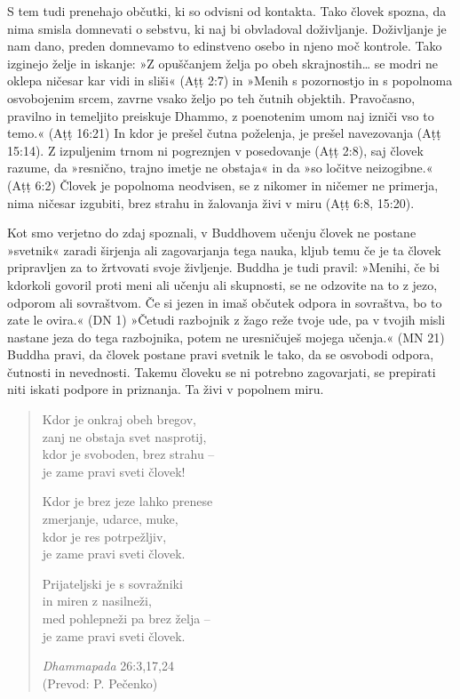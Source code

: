 S tem tudi prenehajo občutki, ki so odvisni od kontakta. Tako človek
spozna, da nima smisla domnevati o sebstvu, ki naj bi obvladoval
doživljanje. Doživljanje je nam dano, preden domnevamo to edinstveno
osebo in njeno moč kontrole. Tako izginejo želje in iskanje: »Z
opuščanjem želja po obeh skrajnostih\ldots{} se modri ne oklepa ničesar
kar vidi in sliši« (Aṭṭ 2:7) in »Menih s pozornostjo in s popolnoma
osvobojenim srcem, zavrne vsako željo po teh čutnih objektih.
Pravočasno, pravilno in temeljito preiskuje Dhammo, z poenotenim umom
naj izniči vso to temo.« (Aṭṭ 16:21) In kdor je prešel čutna poželenja,
je prešel navezovanja (Aṭṭ 15:14). Z izpuljenim trnom ni pogreznjen v
posedovanje (Aṭṭ 2:8), saj človek razume, da »resnično, trajno imetje ne
obstaja« in da »so ločitve neizogibne.« (Aṭṭ 6:2) Človek je popolnoma
neodvisen, se z nikomer in ničemer ne primerja, nima ničesar izgubiti,
brez strahu in žalovanja živi v miru (Aṭṭ 6:8, 15:20).

Kot smo verjetno do zdaj spoznali, v Buddhovem učenju človek ne
postane »svetnik« zaradi širjenja ali zagovarjanja tega nauka, kljub
temu če je ta človek pripravljen za to žrtvovati svoje življenje. Buddha
je tudi pravil: »Menihi, če bi kdorkoli govoril proti meni ali učenju
ali skupnosti, se ne odzovite na to z jezo, odporom ali sovraštvom. Če
si jezen in imaš občutek odpora in sovraštva, bo to zate le ovira.« (DN
1) »Četudi razbojnik z žago reže tvoje ude, pa v tvojih misli nastane
jeza do tega razbojnika, potem ne uresničuješ mojega učenja.« (MN 21)
Buddha pravi, da človek postane pravi svetnik le tako, da se osvobodi
odpora, čutnosti in nevednosti. Takemu človeku se ni potrebno
zagovarjati, se prepirati niti iskati podpore in priznanja. Ta živi v
popolnem miru.

\vspace*{-0.5\baselineskip}
{\setlength{\stanzaskip}{0.5\baselineskip}
\begin{verse}

Kdor je onkraj obeh bregov,\\
zanj ne obstaja svet nasprotij,\\
kdor je svoboden, brez strahu --\\
je zame pravi sveti človek!

Kdor je brez jeze lahko prenese\\
zmerjanje, udarce, muke,\\
kdor je res potrpežljiv,\\
je zame pravi sveti človek.

Prijateljski je s sovražniki\\
in miren z nasilneži,\\
med pohlepneži pa brez želja --\\
je zame pravi sveti človek.

\emph{Dhammapada} 26:3,17,24\\
(Prevod: P. Pečenko)
\end{verse}}

